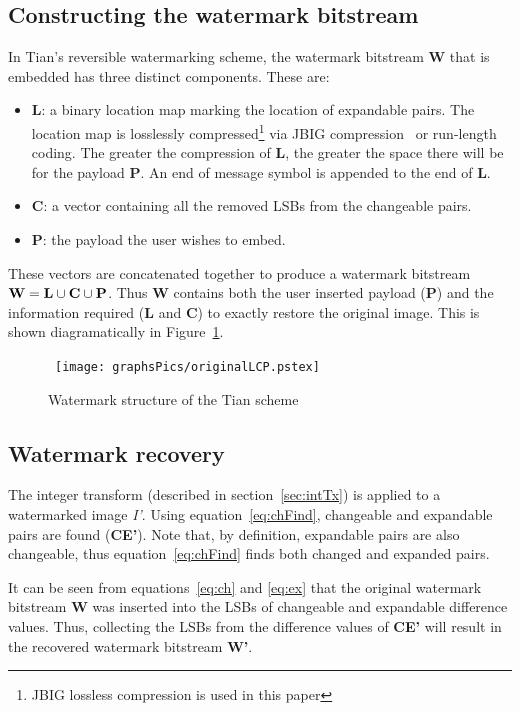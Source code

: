 \documentclass[10pt,twocolumn,letterpaper]{article}
\begin{document}
{\subsection{Constructing the watermark bitstream}
\label{sec:construct}
In Tian's reversible watermarking scheme, 
the watermark bitstream {\bf W} that is embedded has three distinct components.
These are: 
\begin{itemize}
\item {\bf L}: a binary location map marking the location of expandable pairs.
The location map is losslessly compressed\footnote{JBIG lossless compression
is used in this paper} via JBIG compression~\cite{kim97}
or run-length coding.
The greater the compression of {\bf L}, the greater the space there will 
be for the payload {\bf P}.
An end of message symbol is appended to the end of {\bf L}.
\item {\bf C}: a vector containing all the removed LSBs from the changeable pairs.
\item {\bf P}: the payload the user wishes to embed.
\end{itemize}
These vectors are concatenated together to produce a watermark bitstream 
$\mbox{{\bf W}} = \mbox{{\bf L}} \cup \mbox{{\bf C}} \cup \mbox{{\bf P}}$.
Thus {\bf W} contains both the user inserted payload ({\bf P}) and the information
required ({\bf L} and {\bf C}) to exactly restore the original image. This is shown
diagramatically in Figure~\ref{fig:origLCP}.
\begin{figure}[!htb]
\centerline{ \hbox{
        \texttt{[image: graphsPics/originalLCP.pstex]}
}}
        \caption{Watermark structure of the Tian scheme}
        \label{fig:origLCP}
\setlength{\abovecaptionskip}{0cm}
\end{figure}

\subsection{Watermark recovery}
\label{sec:wmrec}
The integer transform (described in section~\ref{sec:intTx}) is applied to a watermarked image \emph{I'}.
Using equation~\ref{eq:chFind}, changeable and expandable pairs are found ({\bf CE'}). 
Note that, by definition, expandable pairs are also changeable, thus equation~\ref{eq:chFind}
finds both changed and expanded pairs.

It can be seen from equations~\ref{eq:ch}
and \ref{eq:ex} that the original watermark bitstream {\bf W} was inserted into the LSBs of changeable and
expandable difference values. Thus, collecting the LSBs from the difference values of {\bf CE'} will 
result in the recovered watermark bitstream {\bf W'}. 

}
\end{document}
